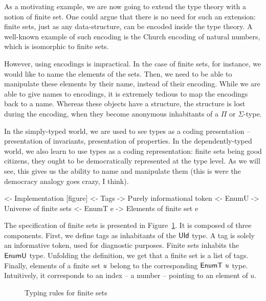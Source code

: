 As a motivating example, we are now going to extend the type theory
with a notion of finite set. One could argue that there is no need for
such an extension: finite sets, just as any data-structure, can be
encoded inside the type theory. A well-known example of such encoding
is the Church encoding of natural numbers, which is isomorphic to
finite sets. 

However, using encodings is impractical. In the case of finite sets,
for instance, we would like to name the elements of the sets. Then, we
need to be able to manipulate these elements by their name, instead of
their encoding. While we are able to give names to encodings, it is
extremely tedious to map the encodings back to a name. Whereas these
objects have a structure, the structure is lost during the encoding,
when they become anonymous inhabitants of a $\Pi$ or $\Sigma$-type.

In the simply-typed world, we are used to see types as a coding
presentation -- presentation of invariants, presentation of
properties. In the dependently-typed world, we also learn to use types
as a coding representation: finite sets being good citizens, they
ought to be democratically represented at the type level. As we will
see, this gives us the ability to name and manipulate them (this is
were the democracy analogy goes crazy, I think).


\begin{wstructure}
<- Implementation [figure]      
    <- Tags
        -> Purely informational token
    <- EnumU
        -> Universe of finite sets
    <- EnumT e
        -> Elements of finite set e
\end{wstructure}

The specification of finite sets is presented in
Figure~\ref{fig:typing-finite-set}. It is composed of three
components. First, we define tags as inhabitants of the $\UId$ type. A
tag is solely an informative token, used for diagnostic
purposes. Finite sets inhabits the $\EnumU$ type. Unfolding the
definition, we get that a finite set is a list of tags. Finally,
elements of a finite set $\V{u}$ belong to the corresponding $\EnumT{\V{u}}$
type. Intuitively, it corresponds to an index -- a number -- pointing
to an element of $u$.

\begin{figure}



\caption{Typing rules for finite sets}
\label{fig:typing-finite-set}

\end{figure}


